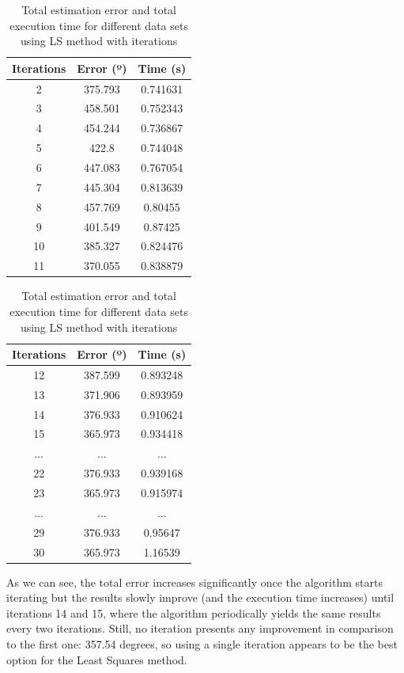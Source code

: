 \begin{table}[h!]
	\centering
	\def\arraystretch{1.2}
	\begin{tabular}{|c c c|} 
		\hline
		Iterations & Error (º) & Time (s) \\ [0.5ex] 
		\hline\hline
		2 & 375.793 & 0.741631 \\
		\hline
		3 & 458.501 & 0.752343 \\
		\hline
		4 & 454.244 & 0.736867 \\
		\hline
		5 & 422.8 & 0.744048 \\
		\hline
		6 & 447.083 & 0.767054 \\
		\hline
		7 & 445.304 & 0.813639 \\
		\hline
		8 & 457.769 & 0.80455 \\
		\hline
		9 & 401.549 & 0.87425 \\
		\hline
		10 & 385.327 & 0.824476 \\
		\hline
		11 & 370.055 & 0.838879 \\
		\hline
	\end{tabular}
	\quad\quad\quad
	\begin{tabular}{|c c c|} 
		\hline
		Iterations & Error (º) & Time (s) \\ [0.3ex] 
		\hline\hline
		12 & 387.599 & 0.893248 \\
		\hline
		13 & 371.906 & 0.893959 \\
		\hline
		14 & 376.933 & 0.910624 \\
		\hline
		15 & 365.973 & 0.934418 \\
		\hline
		... & ... & ... \\
		\hline
		22 & 376.933 & 0.939168 \\
		\hline
		23 & 365.973 & 0.915974 \\
		\hline
		... & ... & ... \\
		\hline
		29 & 376.933 & 0.95647 \\
		\hline
		30 & 365.973 & 1.16539 \\
		\hline
	\end{tabular}
	\caption{Total estimation error and total execution time for different data sets using LS method with iterations}
\end{table}

As we can see, the total error increases significantly once the algorithm starts iterating but the results slowly improve (and the execution time increases) until iterations 14 and 15, where the algorithm periodically yields the same results every two iterations. Still, no iteration presents any improvement in comparison to the first one: 357.54 degrees, so using a single iteration appears to be the best option for the Least Squares method.

